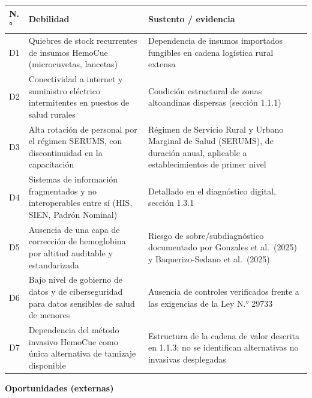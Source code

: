 \documentclass[11pt,a4paper]{article}
\begin{document}
{\small
\begin{longtable}[]{@{}
  >{\raggedright\arraybackslash}p{}
  >{\raggedright\arraybackslash}p{}
  >{\raggedright\arraybackslash}p{}@{}}
\toprule\noalign{}
\begin{minipage}[b]{\linewidth}\raggedright
N.°
\end{minipage} & \begin{minipage}[b]{\linewidth}\raggedright
Debilidad
\end{minipage} & \begin{minipage}[b]{\linewidth}\raggedright
Sustento / evidencia
\end{minipage} \\
\midrule\noalign{}
\endhead
\bottomrule\noalign{}
\endlastfoot
D1 & Quiebres de stock recurrentes de insumos HemoCue (microcuvetas, lancetas) & Dependencia de insumos importados fungibles en cadena logística rural extensa \\
D2 & Conectividad a internet y suministro eléctrico intermitentes en puestos de salud rurales & Condición estructural de zonas altoandinas dispersas (sección 1.1.1) \\
D3 & Alta rotación de personal por el régimen SERUMS, con discontinuidad en la capacitación & Régimen de Servicio Rural y Urbano Marginal de Salud (SERUMS), de duración anual, aplicable a establecimientos de primer nivel \\
D4 & Sistemas de información fragmentados y no interoperables entre sí (HIS, SIEN, Padrón Nominal) & Detallado en el diagnóstico digital, sección 1.3.1 \\
D5 & Ausencia de una capa de corrección de hemoglobina por altitud auditable y estandarizada & Riesgo de sobre/subdiagnóstico documentado por Gonzales et al.~(2025) y Baquerizo-Sedano et al.~(2025) \\
D6 & Bajo nivel de gobierno de datos y de ciberseguridad para datos sensibles de salud de menores & Ausencia de controles verificados frente a las exigencias de la Ley N.° 29733 \\
D7 & Dependencia del método invasivo HemoCue como única alternativa de tamizaje disponible & Estructura de la cadena de valor descrita en 1.1.3; no se identifican alternativas no invasivas desplegadas \\
\end{longtable}
}

\textbf{Oportunidades (externas)}
\end{document}
